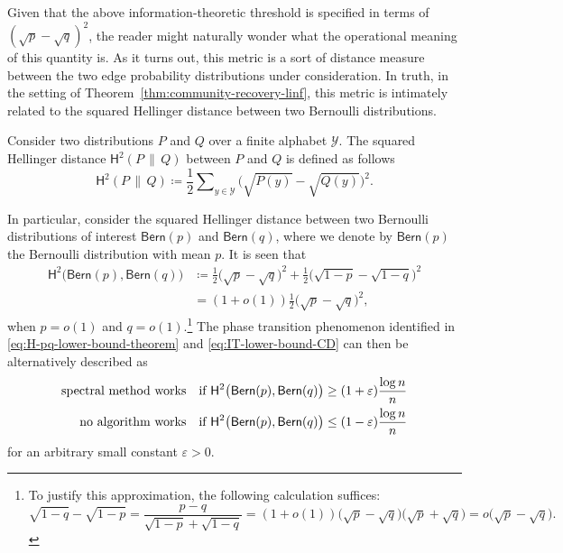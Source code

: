 Given that the above information-theoretic threshold is specified in terms of $( \sqrt{p} -\sqrt{q})^2$,
the reader might naturally wonder what the operational meaning of this quantity is. As it turns out, this metric is a sort of distance measure between the two edge probability distributions under consideration. In truth, in the setting of Theorem~\ref{thm:community-recovery-linf}, this metric is intimately related to the squared Hellinger distance between two Bernoulli distributions.
%
\begin{definition}
%
\label{defn:Hellinger-distance}
Consider two distributions $P$ and $Q$ over a finite alphabet $\mathcal{Y}$. The squared Hellinger distance $\mathsf{H}^2(P\,\|\,Q)$ between $P$ and $Q$  is defined as follows	%
\begin{equation}
\mathsf{H}^2(P\,\|\,Q)\coloneqq\frac{1}{2}\sum\nolimits_{y\in \mathcal{Y}}\Big(\sqrt{P(y)}-\sqrt{Q(y)}\Big)^{2}.
\label{eq:defn-Hellinger-PQ}
\end{equation}
%
\end{definition}
%
In particular, consider the squared Hellinger distance between two Bernoulli distributions of interest $\mathsf{Bern}(p)$ and $\mathsf{Bern}(q)$, where we denote by $\mathsf{Bern}(p)$ the Bernoulli distribution with mean $p$. It is seen that \citep{chen2016information}
%
\begin{align*}
	\mathsf{H}^2\big( \mathsf{Bern}(p),   \mathsf{Bern}(q) \big) 
	&\coloneqq \frac{1}{2} \big( \sqrt{p} -\sqrt{q}\big)^2 + \frac{1}{2} \big( \sqrt{1-p} -\sqrt{1-q}\big)^2 \nonumber\\
	&= (1+o(1)) \frac{1}{2} \big( \sqrt{p} -\sqrt{q}\big)^2,
\end{align*}
%
when $p=o(1)$ and $q=o(1)$.\footnote{To justify this approximation, the following calculation suffices: \[ \sqrt{1-q}-\sqrt{1-p}=\frac{p-q}{\sqrt{1-p}+\sqrt{1-q}}=(1+o(1))\big(\sqrt{p}-\sqrt{q}\big)\big(\sqrt{p}+\sqrt{q}\big)=o\big(\sqrt{p}-\sqrt{q}\big).\]} 
The phase transition phenomenon identified in \eqref{eq:H-pq-lower-bound-theorem} and \eqref{eq:IT-lower-bound-CD} can then be alternatively described as
%
\begin{align*}
\text{\text{spectral method works}}\quad & \text{if }\mathsf{H}^{2}\big(\mathsf{Bern}(p),\mathsf{Bern}(q)\big)\geq(1+\varepsilon)\frac{\log n}{n}\\
\text{no algorithm works}\quad & \text{if }\mathsf{H}^{2}\big(\mathsf{Bern}(p),\mathsf{Bern}(q)\big)\leq(1-\varepsilon)\frac{\log n}{n}
\end{align*}
%
for an arbitrary small constant $\varepsilon >0$. 


